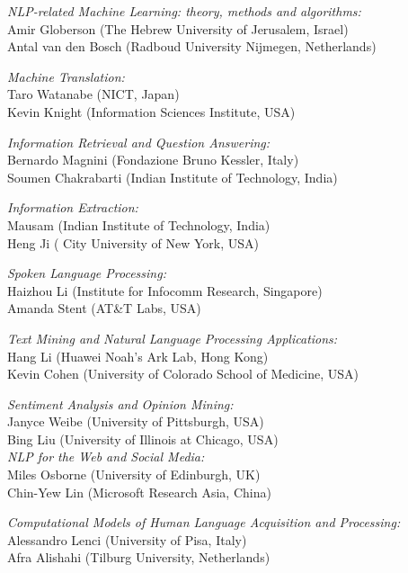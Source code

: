 {\smallskip
\noindent
\textit{NLP-related Machine Learning: theory, methods and algorithms:}\\
  Amir Globerson (The Hebrew University of Jerusalem, Israel)\\
  Antal van den Bosch (Radboud University Nijmegen, Netherlands)

\smallskip
\noindent
\textit{Machine Translation:}\\
  Taro Watanabe (NICT, Japan)\\
  Kevin Knight (Information Sciences Institute, USA)

\smallskip
\noindent
\textit{Information Retrieval and Question Answering:}\\
  Bernardo Magnini (Fondazione Bruno Kessler, Italy)\\
  Soumen Chakrabarti (Indian Institute of Technology, India)

\smallskip
\noindent
\textit{Information Extraction:}\\
  Mausam (Indian Institute of Technology, India)\\
  Heng Ji ( City University of New York, USA)

\smallskip
\noindent
\textit{Spoken Language Processing:}\\
  Haizhou Li (Institute for Infocomm Research, Singapore)\\
  Amanda Stent (AT\&T Labs, USA)

\smallskip
\noindent
\textit{Text Mining and Natural Language Processing Applications:}\\
  Hang Li (Huawei Noah's Ark Lab, Hong Kong)\\
  Kevin Cohen (University of Colorado School of Medicine, USA)

\smallskip
\noindent
\textit{Sentiment Analysis and Opinion Mining:}\\
  Janyce Weibe (University of Pittsburgh, USA)\\
  Bing Liu (University of Illinois at Chicago, USA)\\

\noindent
\textit{NLP for the Web and Social Media:}\\
  Miles Osborne (University of Edinburgh, UK)\\
  Chin-Yew Lin (Microsoft Research Asia, China)

\smallskip
\noindent
\textit{Computational Models of Human Language Acquisition and Processing:}\\
  Alessandro Lenci (University of Pisa, Italy)\\
  Afra Alishahi (Tilburg University, Netherlands)
}

